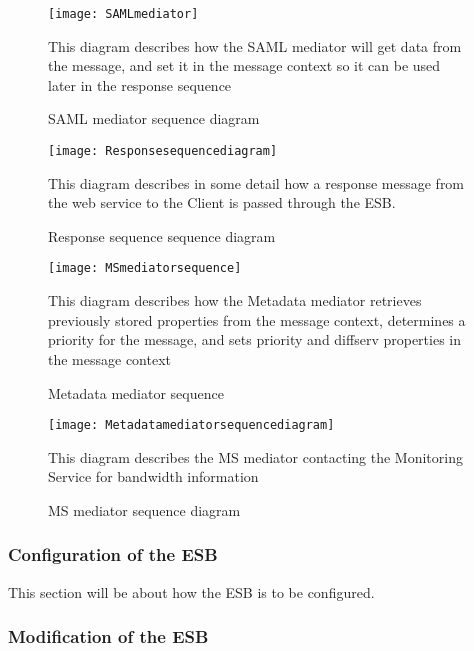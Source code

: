         \begin{figure}[H]
            \centering
            \texttt{[image: SAMLmediator]}
            \caption{SAML mediator sequence diagram}
            This diagram describes how the SAML mediator will get data from the message, and set it in the message context so it can be used later in the response sequence
            \label{fig:SAMLmediator}
        \end{figure}
        
        \begin{figure}[H]
            \texttt{[image: Responsesequencediagram]}
            \caption{Response sequence sequence diagram}
            This diagram describes in some detail how a response message from the web service to the Client is passed through the ESB.
            \label{fig:Responsesequencediagram}
        \end{figure}
    
        \begin{figure}[H]
            \centering
            \texttt{[image: MSmediatorsequence]}
            \caption{Metadata mediator sequence}
            This diagram describes how the Metadata mediator retrieves previously stored properties from the message context, determines a priority for the message, and sets priority and diffserv properties in the message context
            \label{fig:MSmediatorsequence}
        \end{figure}
        
        \begin{figure}[H]
            \centering
            \texttt{[image: Metadatamediatorsequencediagram]}
            \caption{MS mediator sequence diagram}
            This diagram describes the MS mediator contacting the Monitoring Service for bandwidth information
            \label{fig:Metadatamediatorsequencediagram}
        \end{figure}

    \subsubsection{Configuration of the ESB}\label{Configuration of the ESB} 
    This section will be about how the ESB is to be configured.

    \subsubsection{Modification of the ESB}\label{Modification of the ESB} 

